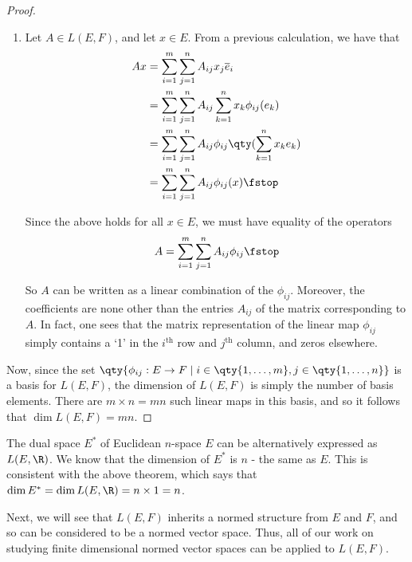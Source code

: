 \begin{proof}
\begin{enumerate}[label=(\roman*)]
   \item Let \( A\in L(E,F) \), and let \( x\in E \). From a previous calculation, we have that
     \begin{align*}
       Ax&=\sum_{i=1}^m\sum_{j=1}^n A_{ij}x_j\overline{e}_i\\
       &=\sum_{i=1}^m\sum_{j=1}^nA_{ij}\sum_{k=1}^nx_k\phi_{ij}(e_k)\\
       &=\sum_{i=1}^m\sum_{j=1}^nA_{ij}\phi_{ij}\qty(\sum_{k=1}^nx_ke_k)\\
       &=\sum_{i=1}^m\sum_{j=1}^nA_{ij}\phi_{ij}(x)\fstop 
     \end{align*}

     Since the above holds for all \( x\in E \), we must have equality of the operators
     \[ A=\sum_{i=1}^m\sum_{j=1}^nA_{ij}\phi_{ij}\fstop \]

     So \( A \) can be written as a linear combination of the \( \phi_{ij} \). Moreover, the coefficients are none other than the entries \( A_{ij} \) of the matrix corresponding to \( A \). In fact, one sees that the matrix representation of the linear map \( \phi_{ij} \) simply contains a `1' in the \( i^{\text{th}} \) row and \( j^{\text{th}} \) column, and zeros elsewhere.
   \end{enumerate}

   Now, since the set \( \qty{\phi_{ij}:E\to F\mid i\in\qty{1,\dots,m},j\in\qty{1,\dots,n}} \) is a basis for \( L(E,F) \), the dimension of \( L(E,F) \) is simply the number of basis elements. There are \( m\times n=mn \) such linear maps in this basis, and so it follows that \( \dim L(E,F)=mn \).
 \end{proof}

 The dual space \( E^* \) of Euclidean \( n \)-space \( E \) can be alternatively expressed as \( L(E,\R) \). We know that the dimension of \( E^* \) is \( n \) - the same as \( E \). This is consistent with the above theorem, which says that \( \dim E^*=\dim L(E,\R)=n\times 1=n \).

 \vspace{3mm}

 Next, we will see that \( L(E,F) \) inherits a normed structure from \( E \) and \( F \), and so can be considered to be a normed vector space. Thus, all of our work on studying finite dimensional normed vector spaces can be applied to \( L(E,F) \).

